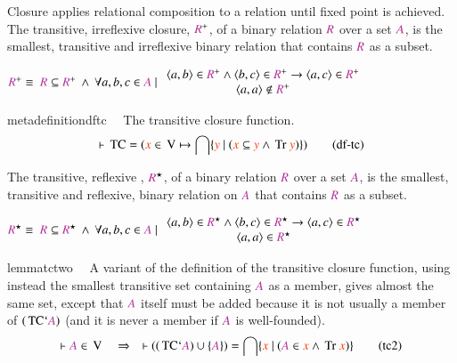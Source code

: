 \pn Closure applies relational composition to a relation until fixed point is achieved.
 The transitive, irreflexive closure, $\mc{R}^{+}$, 
 of a binary relation $\mc{R}$ over a set $ \mc{A}$, is the smallest, transitive and irreflexive binary relation that contains $\mc{R}$ as a subset.
  
\(\mc{R}^{+} \equiv~\mc{R} \subseteq \mc{R}^{+}~\band~\forall a,b,c\in  \mc{A} ~\vert~  
 \begin{array}{c}
 \langle a,b\rangle\in \mc{R}^{+}\wedge\langle b,c\rangle\in \mc{R}^{+} \rightarrow \langle a,c\rangle\in \mc{R}^{+}\\
 \langle a,a\rangle\notin \mc{R}^{+}
 \end{array}
 \)

\begin{restatable}{metadefinition}{dftc}~~ The transitive closure function. 
\begin{align}
\vdash \,\mathrm{TC} = ( \msc{x} \in \,\mathrm{V} \mapsto \bigcap \{ \msc{y}~\vert~
    ( \msc{x} \subseteq \msc{y} \wedge \,\mathrm{Tr}~\msc{y} ) \}
    )\label{eq:df-tc}\tag{df-tc}
\end{align}
\end{restatable}

 \pn The transitive, reflexive , $\mc{R}^{\star}$, of a binary relation $\mc{R}$ over a set $ \mc{A}$, is the smallest, transitive and reflexive, binary relation on $ \mc{A}$ that contains $\mc{R}$ as a subset. 
 
\(\mc{R}^\star \equiv~\mc{R} \subseteq \mc{R}^\star~\band~\forall a,b,c\in  \mc{A} ~\vert~  
 \begin{array}{c}
 \langle a,b\rangle\in \mc{R}^\star\wedge\langle b,c\rangle\in \mc{R}^\star \rightarrow \langle a,c\rangle\in \mc{R}^\star\\
 \langle a,a\rangle\in \mc{R}^\star
 \end{array}
 \)

\begin{restatable}{lemma}{tctwo}~~ A variant of the definition of the transitive
closure function, using
       instead the smallest transitive set containing $\mc{A}$ as a member,
gives
       almost the same set, except that $\mc{A}$ itself must be added because
it
       is not usually a member of $( \,\mathrm{TC} ` \mc{A} )$ (and it is
never a member if
       $\mc{A}$ is well-founded).  ~
\begin{align}
\vdash \mc{A} \in \,\mathrm{V}\quad\Rightarrow\quad \vdash ( ( \,\mathrm{TC} `
    \mc{A} ) \cup \{ \mc{A} \} ) = \bigcap \{ \msc{x}~\vert~( \mc{A} \in \msc{x}
    \wedge \,\mathrm{Tr}~\msc{x} ) \}\label{eq:tc2}\tag{tc2}
\end{align}
\end{restatable}


